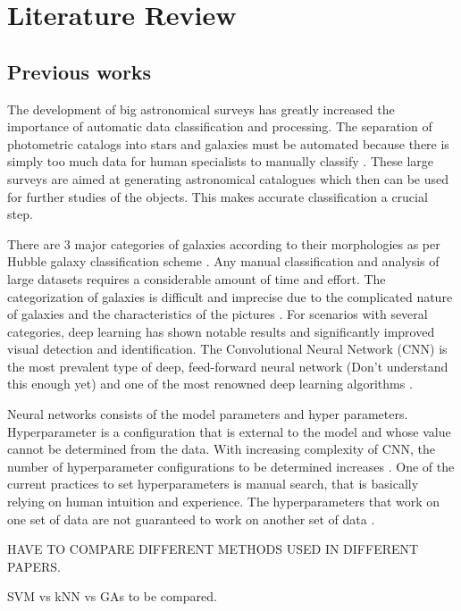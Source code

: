 \chapter{Literature Review}
\section{Previous works}
The development of big astronomical surveys has greatly increased the importance of automatic data classification and processing. The separation of photometric catalogs into stars and galaxies must be automated because there is simply too much data for human specialists to manually classify \citep{Kim2016}. These large surveys are aimed at generating astronomical catalogues which then can be used for further studies of the objects. This makes accurate classification a crucial step.

There are 3 major categories of galaxies according to their morphologies as per Hubble galaxy classification scheme \citep{Hubble}. Any manual classification and analysis of large datasets requires a considerable amount of time and effort. The categorization of galaxies is difficult and imprecise due to the complicated nature of galaxies and the characteristics of the pictures \citep{Khalifa}. For scenarios with several categories, deep learning has shown notable results and significantly improved visual detection and identification.
The Convolutional Neural Network (CNN) is the most prevalent type of deep, feed-forward neural network (Don't understand this enough yet) and one of the most renowned deep learning algorithms \citep{Khalifa}. 

Neural networks consists of the model parameters and hyper parameters. Hyperparameter is a configuration that is external to the model and whose value cannot be determined from the data. With increasing complexity of CNN, the number of hyperparameter configurations to be determined increases \citep{Cui}.
One of the current practices to set hyperparameters is manual search, that is basically relying on human intuition and experience. The hyperparameters that work on one set of data are not guaranteed to work on another set of data \citep{Young}.
\pagebreak


HAVE TO COMPARE DIFFERENT METHODS USED IN DIFFERENT PAPERS.

SVM\citep{Zhang2012} vs kNN vs GAs to be compared. \citep{Philip} \citep{Wierzbiński}

